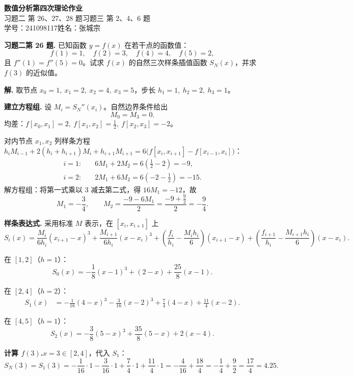 \documentclass[UTF8,a4paper,11pt]{ctexart}
\begin{document}
\begin{center}
  {\LARGE\bfseries 数值分析\quad 第四次理论作业}\\[6pt]
  {\large 习题二 第 26、27、28 题\quad 习题三 第 2、4、6 题}\\[4pt]
  {\normalsize 学号：241098117\quad 姓名：张城宗}
\end{center}

\bigskip

\noindent\textbf{习题二\quad 第 26 题.}\quad
已知函数 $y=f(x)$ 在若干点的函数值：
\[
  f(1)=1,\quad f(2)=3,\quad f(4)=4,\quad f(5)=2,
\]
且 $f''(1)=f''(5)=0$。试求 $f(x)$ 的自然三次样条插值函数 $S_N(x)$，并求 $f(3)$ 的近似值。

\medskip
\noindent\textbf{解.}\quad
取节点 $x_0=1,\ x_1=2,\ x_2=4,\ x_3=5$，步长 $h_1=1,\ h_2=2,\ h_3=1$。

\medskip
\noindent\textbf{建立方程组.}\quad
设 $M_i=S_N''(x_i)$。自然边界条件给出
\[
  M_0 = M_3 = 0.
\]
均差：$f[x_0,x_1]=2,\ f[x_1,x_2]=\tfrac{1}{2},\ f[x_2,x_3]=-2$。

对内节点 $x_1, x_2$ 列样条方程
$h_i M_{i-1}+2(h_i+h_{i+1})M_i+h_{i+1}M_{i+1}=6\bigl(f[x_i,x_{i+1}]-f[x_{i-1},x_i]\bigr)$：
\begin{align*}
  i=1:&\quad 6M_1+2M_2 = 6\!\left(\tfrac{1}{2}-2\right)=-9,\\
  i=2:&\quad 2M_1+6M_2 = 6(-2-\tfrac{1}{2})=-15.
\end{align*}
解方程组：将第一式乘以 $3$ 减去第二式，得 $16M_1=-12$，故
\[
  M_1 = -\frac{3}{4},\qquad
  M_2 = \frac{-9-6M_1}{2} = \frac{-9+\frac{9}{2}}{2} = -\frac{9}{4}.
\]

\medskip
\noindent\textbf{样条表达式.}\quad
采用标准 $M$ 表示，在 $[x_i,x_{i+1}]$ 上
\[
  S_i(x)=\frac{M_i}{6h_i}(x_{i+1}-x)^3+\frac{M_{i+1}}{6h_i}(x-x_i)^3
  +\!\left(\frac{f_i}{h_i}-\frac{M_i h_i}{6}\right)\!(x_{i+1}-x)
  +\!\left(\frac{f_{i+1}}{h_i}-\frac{M_{i+1}h_i}{6}\right)\!(x-x_i).
\]

\noindent 在 $[1,2]$（$h=1$）：
\[
  S_0(x) = -\frac{1}{8}(x-1)^3+(2-x)+\frac{25}{8}(x-1).
\]

\noindent 在 $[2,4]$（$h=2$）：
\begin{align*}
  S_1(x) &= -\frac{1}{16}(4-x)^3-\frac{3}{16}(x-2)^3+\frac{7}{4}(4-x)+\frac{11}{4}(x-2).
\end{align*}

\noindent 在 $[4,5]$（$h=1$）：
\[
  S_2(x) = -\frac{3}{8}(5-x)^3+\frac{35}{8}(5-x)+2(x-4).
\]

\medskip
\noindent\textbf{计算 $f(3)$.}\quad $x=3\in[2,4]$，代入 $S_1$：
\[
  S_N(3)=S_1(3)=-\frac{1}{16}\cdot1-\frac{3}{16}\cdot1+\frac{7}{4}\cdot1+\frac{11}{4}\cdot1
  = -\frac{4}{16}+\frac{18}{4} = -\frac{1}{4}+\frac{9}{2} = \boxed{\frac{17}{4}=4.25}.
\]
\end{document}
